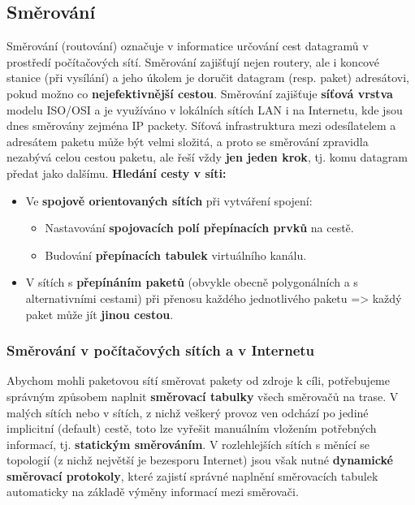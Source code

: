 \subsection{Směrování} 
Směrování (routování) označuje v informatice určování cest datagramů v prostředí počítačových sítí. Směrování zajišťují nejen routery, ale i koncové stanice (při vysílání) a jeho úkolem je doručit datagram (resp. paket) adresátovi, pokud možno co \textbf{nejefektivnější cestou}. Směrování zajišťuje \textbf{síťová vrstva} modelu ISO/OSI a je využíváno v lokálních sítích LAN i na Internetu, kde jsou dnes směrovány zejména IP packety. Síťová infrastruktura mezi odesílatelem a adresátem paketu může být velmi složitá, a proto se směrování zpravidla nezabývá celou cestou paketu, ale řeší vždy \textbf{jen jeden krok}, tj. komu datagram předat jako dalšímu. \textbf{Hledání cesty v síti:}

\begin{itemize}
	\item Ve \textbf{spojově orientovaných sítích} při vytváření spojení:
	\begin{itemize}
		\item Nastavování \textbf{spojovacích polí přepínacích prvků} na cestě.
		\item Budování \textbf{přepínacích tabulek} virtuálního kanálu.
	\end{itemize}
	\item V sítích s \textbf{přepínáním paketů} (obvykle obecně polygonálních a s alternativními cestami) při přenosu každého jednotlivého paketu => každý paket může jít \textbf{jinou cestou}.
\end{itemize}

\subsubsection*{Směrování v počítačových sítích a v Internetu}
Abychom mohli paketovou sítí směrovat pakety od zdroje k cíli, potřebujeme správným způsobem naplnit \textbf{směrovací tabulky} všech směrovačů na trase. V malých sítích nebo v sítích, z nichž veškerý provoz ven odchází po jediné implicitní (default) cestě, toto lze vyřešit manuálním vložením potřebných informací, tj. \textbf{statickým směrováním}. V rozlehlejších sítích s měnící se topologií (z nichž největší je bezesporu Internet) jsou však nutné \textbf{dynamické směrovací protokoly}, které zajistí správné naplnění směrovacích tabulek automaticky na základě výměny informací mezi směrovači.

